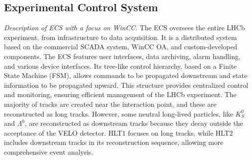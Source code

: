 \subsection{Experimental Control System}
\textit{Description of ECS with a focus on WinCC.
}
The ECS\cite{GranadoCardoso:2702137} oversees the entire LHCb experiment, from infrastructure to data acquisition. It is a distributed system based on the commercial SCADA system, WinCC OA, and custom-developed components. The ECS features user interfaces, data archiving, alarm handling, and various device interfaces. Its tree-like control hierarchy, based on a Finite State Machine (FSM), allows commands to be propagated downstream and state information to be propagated upward. This structure provides centralized control and monitoring, ensuring efficient management of the LHCb experiment.
The majority of tracks are created near the interaction point, and these are reconstructed as long tracks. However, some neutral long-lived particles, like $K^0_S$ and $\Lambda^0$, are reconstructed as downstream tracks because they decay outside the acceptance of the VELO detector. HLT$1$ focuses on long tracks, while HLT$2$ includes downstream tracks in its reconstruction sequence, allowing more comprehensive event analysis.



